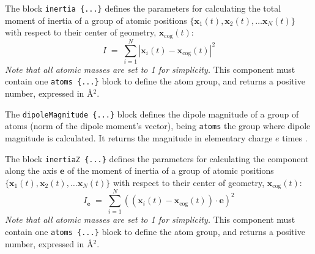The block \texttt{inertia~\{...\}} defines the
parameters for calculating the total moment of inertia of a group of atomic
positions $\{ \mathbf{x}_1(t), \mathbf{x}_2(t), \ldots \mathbf{x}_N(t)
\}$ with respect to their center of geometry,
$\mathbf{x}_{\mathrm{cog}}(t)$:
\begin{equation}
  \label{eq:colvar_inertia}
  I \; = \; \sum_{i=1}^{N} \left|\mathbf{x}_{i}(t) -
      \mathbf{x}_{\mathrm{cog}}(t)\right|^{2}
\end{equation}
\emph{Note that all atomic masses are set to 1 for simplicity.}
This component must contain one \texttt{atoms~\{...\}} block to
define the atom group, and returns a positive number, expressed in
\AA{}$^{2}$.

\begin{cvcoptions}
\item %
\end{cvcoptions}


The \texttt{dipoleMagnitude~\{...\}} block defines the dipole magnitude of a group of atoms (norm of the dipole moment's vector), being \texttt{atoms} the group where dipole magnitude is calculated.
It returns the magnitude in elementary charge $e$ times \cvnamdonly{\AA}\cvvmdonly{\AA}.

\begin{cvcoptions}
\item %
\end{cvcoptions}



The block \texttt{inertiaZ~\{...\}} defines the
parameters for calculating the component along the axis $\mathbf{e}$ of the moment of inertia of a group of atomic
positions $\{ \mathbf{x}_1(t), \mathbf{x}_2(t), \ldots \mathbf{x}_N(t)
\}$ with respect to their center of geometry,
$\mathbf{x}_{\mathrm{cog}}(t)$:
\begin{equation}
  \label{eq:colvar_inertia_z}
  I_{\mathbf{e}} \; = \; \sum_{i=1}^{N} \left(\left(\mathbf{x}_{i}(t) -
      \mathbf{x}_{\mathrm{cog}}(t)\right)\cdot\mathbf{e}\right)^{2}
\end{equation}
\emph{Note that all atomic masses are set to 1 for simplicity.}
This component must contain one \texttt{atoms~\{...\}} block to
define the atom group, and returns a positive number, expressed in
\AA{}$^{2}$.


